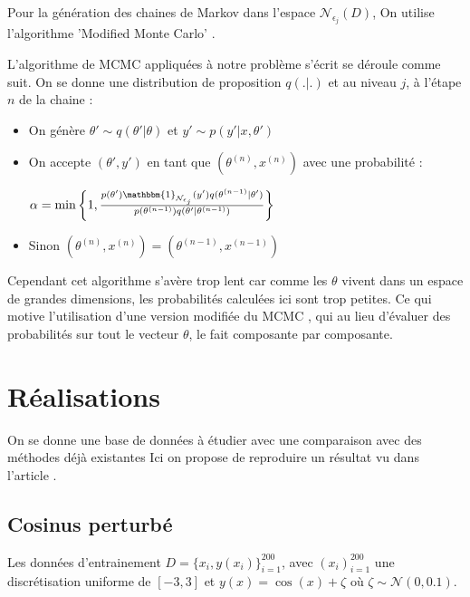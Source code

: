 \documentclass[french,12pt]{article}
\let\oldsection\section%
\renewcommand{\section}{%
  \renewcommand{\theequation}{\thesection.\arabic{equation}}%
  \oldsection}%
\let\oldsubsection\subsection%
\renewcommand{\subsection}{%
  \renewcommand{\theequation}{\thesubsection.\arabic{equation}}%
  \oldsubsection}%
\begin{document}

Pour la génération des chaines de Markov dans l'espace $\mathcal{N}_{\epsilon_{j}} (D)$, On utilise l'algorithme
'Modified Monte Carlo' \cite{Chiachio2014, Modified_MCMC}.

L'algorithme de MCMC \cite{Andrieu2003} appliquées à notre problème s'écrit se déroule comme suit.
On se donne une distribution de proposition $q(.|.)$ et au niveau $j$, à l'étape $n$ de la chaine :

\begin{itemize}
    \item On génère $\theta' \sim q(\theta' | \theta)$ et $y' \sim p(y' |x, \theta')$
    \item On accepte $(\theta', y')$ en tant que $(\theta^{(n)}, x^{(n)})$ avec une probabilité :

          $\alpha = \min \left\{ 1, \frac{p(\theta') \mathbbm{1}_{\mathcal{N}_{\epsilon_j}} (y') q(\theta^{(n - 1)} | \theta')}{p(\theta^{(n - 1)}) q(\theta' | \theta^{(n-1)})}\right\}$

    \item Sinon $(\theta^{(n)}, x^{(n)}) = (\theta^{(n-1)}, x^{(n-1)})$
\end{itemize}

Cependant cet algorithme s'avère trop lent car comme les $\theta$ vivent dans un
espace de grandes dimensions, les probabilités calculées ici sont trop petites. Ce
qui motive l'utilisation d'une version modifiée du MCMC \cite{Modified_MCMC}, qui au lieu
d'évaluer des probabilités sur tout le vecteur $\theta$, le fait composante par composante.


\pagebreak
\section{Réalisations}
On se donne une base de données à étudier avec une comparaison avec des méthodes déjà existantes \cite{Chiachio2014,Fernndez2022,Uncertainty_Deep}
Ici on propose de reproduire un résultat vu dans l'article \cite{Fernndez2022}.

\subsection{Cosinus perturbé}

Les données d'entrainement $D = \{x_i , y(x_i)\}_{i = 1}^{200}$, avec $(x_i)_{i = 1}^{200}$
une discrétisation uniforme de $[-3, 3]$ et $y(x) = \cos(x) + \zeta$ où $\zeta \sim \mathcal{N}(0, 0.1)$.
\end{document}
